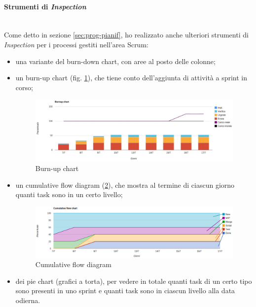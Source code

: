 \paragraph{Strumenti di \emph{Inspection}} \mbox{} \\

Come detto in sezione \ref{sec:prog-pianif}, ho realizzato anche ulteriori
strumenti di \emph{Inspection} per i processi gestiti nell'area Scrum:

\begin{itemize}
\item una variante del burn-down chart, con aree al posto delle colonne;
\item un burn-up chart (fig. \ref{fig:burnup}), che tiene conto dell'aggiunta
  di attività a sprint in corso;

  \begin{figure}[H]%
  \centering
  \includegraphics[width=1.1\columnwidth]{immagini/burnup}
  \caption{Burn-up chart}
  \label{fig:burnup}%
  \end{figure}

\item un cumulative flow diagram (\ref{fig:cumulative}), che mostra al termine
  di ciascun giorno quanti task sono in un certo livello;

  \begin{figure}[H]%
  \centering
  \includegraphics[width=1.1\columnwidth]{immagini/cumulativeFlow}
  \caption{Cumulative flow diagram}
  \label{fig:cumulative}%
  \end{figure}

\item dei pie chart (grafici a torta), per vedere in totale quanti task
  di un certo tipo sono presenti in uno sprint e quanti task sono in ciascun
  livello alla data odierna.
\end{itemize}

